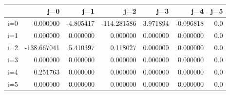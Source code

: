 \begin{tabular}{lrrrrrr}
\toprule
{} &         j=0 &       j=1 &         j=2 &       j=3 &       j=4 &  j=5 \\
\midrule
i=0 &    0.000000 & -4.805417 & -114.281586 &  3.971894 & -0.096818 &  0.0 \\
i=1 &    0.000000 &  0.000000 &    0.000000 &  0.000000 &  0.000000 &  0.0 \\
i=2 & -138.667041 &  5.410397 &    0.118027 &  0.000000 &  0.000000 &  0.0 \\
i=3 &    0.000000 &  0.000000 &    0.000000 &  0.000000 &  0.000000 &  0.0 \\
i=4 &    0.251763 &  0.000000 &    0.000000 &  0.000000 &  0.000000 &  0.0 \\
i=5 &    0.000000 &  0.000000 &    0.000000 &  0.000000 &  0.000000 &  0.0 \\
\bottomrule
\end{tabular}
